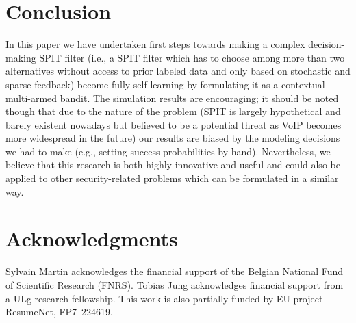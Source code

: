 \documentclass{llncs}
\begin{document}
\section{Conclusion}

In this paper we have undertaken first steps towards making a complex decision-making SPIT filter
(i.e., a SPIT filter which has to choose among more than two alternatives without access to prior
labeled data and only based on stochastic and sparse feedback) become fully self-learning by formulating
it as a contextual multi-armed bandit. The simulation results are encouraging; it should be noted though
that due to the nature of the problem  
(SPIT is largely hypothetical and barely existent nowadays but believed to be a potential threat as VoIP becomes 
more widespread in the future)
our results are biased
by the modeling decisions we had to make (e.g., setting success probabilities by hand). Nevertheless, 
we believe that this research is both highly innovative and useful and could also be applied to other 
security-related problems which can be formulated in a similar way. 




\section*{Acknowledgments}
{\small  Sylvain Martin acknowledges the financial support of the Belgian National Fund of Scientific Research (FNRS). 
Tobias Jung acknowledges financial support from a ULg research fellowship.
This work is also partially funded by {EU} project {R}esume{N}et, FP7--224619.
}



  
\end{document}
